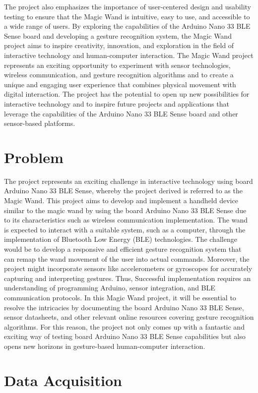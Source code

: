 The project also emphasizes the importance of user-centered design and usability testing to ensure that the Magic Wand is intuitive, easy to use, and accessible to a wide range of users. 
By exploring the capabilities of the Arduino Nano 33 BLE Sense board and developing a gesture recognition system, the Magic Wand project aims to inspire creativity, innovation, and exploration in the field of interactive technology and human-computer interaction. 
The Magic Wand project represents an exciting opportunity to experiment with sensor technologies, wireless communication, and gesture recognition algorithms and to create a unique and engaging user experience that combines physical movement with digital interaction. 
The project has the potential to open up new possibilities for interactive technology and to inspire future projects and applications that leverage the capabilities of the Arduino Nano 33 BLE Sense board and other sensor-based platforms. 
\section{Problem}
The project represents an exciting challenge in interactive technology
using board Arduino Nano 33 BLE Sense, whereby the project derived is
referred to as the Magic Wand. This project aims to develop and implement a handheld device similar to the magic wand by using the board
Arduino Nano 33 BLE Sense due to its characteristics such as wireless
communication implementation. The wand is expected to interact with
a suitable system, such as a computer, through the implementation of
Bluetooth Low Energy (BLE) technologies. The challenge would be to
develop a responsive and efficient gesture recognition system that can
remap the wand movement of the user into actual commands. 
Moreover, the project might incorporate sensors like accelerometers or gyroscopes for accurately capturing and interpreting gestures. 
Thus, Successful implementation requires an understanding of programming Arduino, sensor integration, and BLE communication protocols. 
In this Magic Wand project, it will be essential to resolve the intricacies by documenting
the board Arduino Nano 33 BLE Sense, sensor datasheets, and other
relevant online resources covering gesture recognition algorithms. For this
reason, the project not only comes up with a fantastic and exciting way
of testing board Arduino Nano 33 BLE Sense capabilities but also opens
new horizons in gesture-based human-computer interaction.

\section{Data Acquisition}

